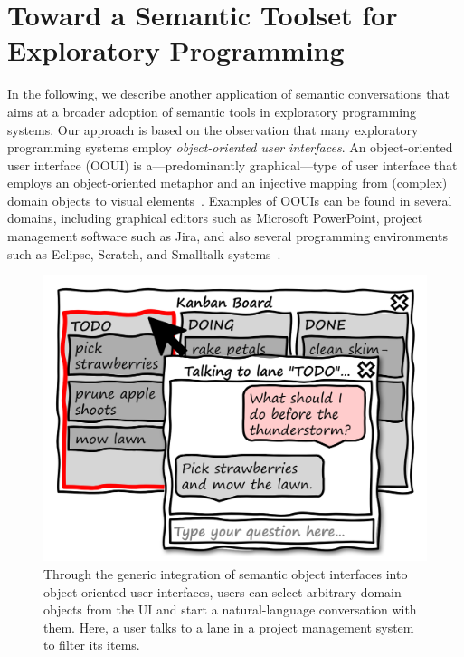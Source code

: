 
\section{Toward a Semantic Toolset for Exploratory Programming}
\label{sec:application/system}

In the following, we describe another application of semantic conversations that aims at a broader adoption of semantic tools in exploratory programming systems.
Our approach is based on the observation that many exploratory programming systems employ \emph{object-oriented user interfaces}.
An object-oriented user interface (OOUI) is a---predominantly graphical---type of user interface that employs an object-oriented metaphor and an injective mapping from (complex) domain objects to visual elements~\cite{collins1995designing}.
Examples of OOUIs can be found in several domains, including graphical editors such as Microsoft PowerPoint, project management software such as Jira, and also several programming environments such as Eclipse, Scratch, and Smalltalk systems~\cite{pawson2001naked}.

\begin{figure}
	\centering
	\includegraphics[height=12\baselineskip]{chapters/08_application/03_system/project.png}
	\caption[Sketching a generic integration of semantic object interfaces into object-oriented user interfaces.]{
		Through the generic integration of semantic object interfaces into object-oriented user interfaces, users can select arbitrary domain objects from the UI and start a natural-language conversation with them.
		Here, a user talks to a lane in a project management system to filter its items.
	}
	\label{fig:application/system/project}
\end{figure}

